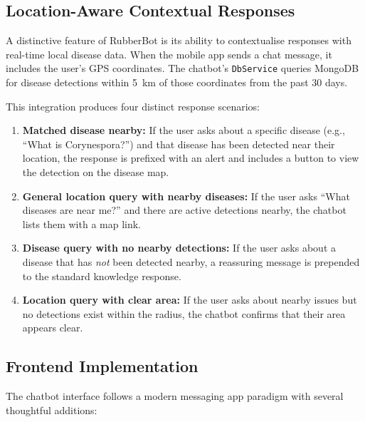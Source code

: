 \subsection{Location-Aware Contextual Responses}

A distinctive feature of RubberBot is its ability to contextualise responses with real-time local disease data. When the mobile app sends a chat message, it includes the user's GPS coordinates. The chatbot's \texttt{DbService} queries MongoDB for disease detections within 5~km of those coordinates from the past 30 days.

This integration produces four distinct response scenarios:

\begin{enumerate}
    \item \textbf{Matched disease nearby:} If the user asks about a specific disease (e.g., ``What is Corynespora?'') and that disease has been detected near their location, the response is prefixed with an alert and includes a button to view the detection on the disease map.
    \item \textbf{General location query with nearby diseases:} If the user asks ``What diseases are near me?'' and there are active detections nearby, the chatbot lists them with a map link.
    \item \textbf{Disease query with no nearby detections:} If the user asks about a disease that has \textit{not} been detected nearby, a reassuring message is prepended to the standard knowledge response.
    \item \textbf{Location query with clear area:} If the user asks about nearby issues but no detections exist within the radius, the chatbot confirms that their area appears clear.
\end{enumerate}

\subsection{Frontend Implementation}

The chatbot interface follows a modern messaging app paradigm with several thoughtful additions:

